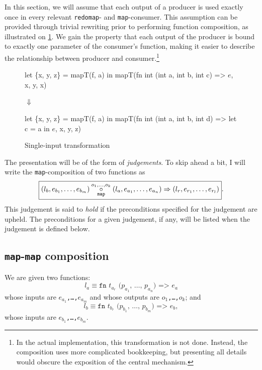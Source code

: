 In this section, we will assume that each output of a producer is used
exactly once in every relevant \texttt{redomap}- and
\texttt{map}-consumer.  This assumption can be provided through
trivial rewriting prior to performing function composition, as
illustrated on \cref{fig:single-input-transform}.  We gain the
property that each output of the producer is bound to exactly one
parameter of the consumer's function, making it easier to describe the
relationship between producer and consumer.\footnote{In the actual
  implementation, this transformation is not done.  Instead, the
  composition uses more complicated bookkeeping, but presenting all
  details would obscure the exposition of the central mechanism.}

\begin{figure}
\begin{center}
\begin{bcolorcode}
let \{x, y, z\} = mapT(f, a) in
mapT(fn int (int a, int b, int c) => \(e\), x, y, x)
\end{bcolorcode}

$\Downarrow$

\begin{bcolorcode}
let \{x, y, z\} = mapT(f, a) in
mapT(fn int (int a, int b, int d) =>
       let c = a in \(e\),
     x, y, z)
\end{bcolorcode}
\end{center}
\caption{Single-input transformation}
\label{fig:single-input-transform}
\end{figure}

The presentation will be of the form of \textit{judgements}.  To skip
ahead a bit, I will write the \texttt{map}-composition of two
functions as
\[
\boxed{
(l_{b},e_{b_{1}},\ldots,e_{b_{m}}) \underset{\texttt{map}}{\overset{o_1,\ldots,o_k}\circ}(l_{a},e_{a_{1}},\ldots,e_{a_{n}}) \Rightarrow (l_{r},e_{r_{1}},\ldots,e_{r_{l}})
}.
\]
This judgement is said to \textit{hold} if the preconditions specified
for the judgement are upheld.  The preconditions for a given
judgement, if any, will be listed when the judgement is defined below.

\subsection{\texttt{map}-\texttt{map} composition}
\label{sec:map-map-composition}

We are given two functions:
\[
l_{a}\equiv\texttt{fn $t_{a_{r}}$ ($p_{a_{1}}$, \ldots, $p_{a_{n}}$) => $e_{a}$}
\]
whose inputs are \texttt{$e_{a_{1}}$,\ldots,$e_{a_{m}}$} and whose
outputs are \texttt{$o_1$,\ldots,$o_k$}; and
\[
l_{b}\equiv\texttt{fn $t_{b_{r}}$ ($p_{b_{1}}$, \ldots, $p_{b_{m}}$) => $e_{b}$},
\]
whose inputs are \texttt{$e_{b_{1}}$,\ldots,$e_{b_{m}}$}.

